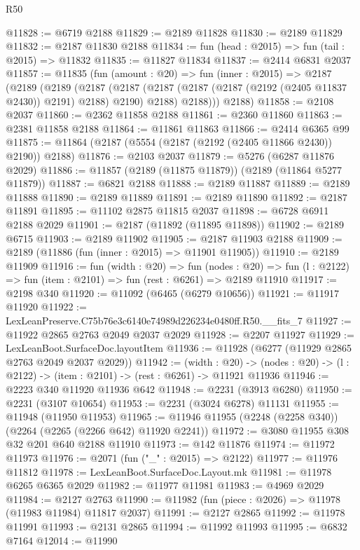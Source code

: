 \begin{lexlean}{R50}
\begin{coremodule}
@11828 := @6719 @2188
@11829 := @2189 @11828
@11830 := @2189 @11829
@11832 := @2187 @11830 @2188
@11834 := fun (head : @2015) => fun (tail : @2015) => @11832
@11835 := @11827 @11834
@11837 := @2414 @6831 @2037
@11857 := @11835
    (fun (amount : @20) =>
    fun (inner : @2015) =>
    @2187
      (@2189
        (@2189
          (@2187
            (@2187 (@2187 (@2187 (@2187 (@2192 (@2405 @11837 @2430)) @2191) @2188) @2190) @2188)
            @2188)))
      @2188)
@11858 := @2108 @2037
@11860 := @2362 @11858 @2188
@11861 := @2360 @11860
@11863 := @2381 @11858 @2188
@11864 := @11861 @11863
@11866 := @2414 @6365 @99
@11875 := @11864 (@2187 (@5554 (@2187 (@2192 (@2405 @11866 @2430)) @2190)) @2188)
@11876 := @2103 @2037
@11879 := @5276 (@6287 @11876 @2029)
@11886 := @11857 (@2189 (@11875 @11879)) (@2189 (@11864 @5277 @11879))
@11887 := @6821 @2188
@11888 := @2189 @11887
@11889 := @2189 @11888
@11890 := @2189 @11889
@11891 := @2189 @11890
@11892 := @2187 @11891
@11895 := @11102 @2875 @11815 @2037
@11898 := @6728 @6911 @2188 @2029
@11901 := @2187 (@11892 (@11895 @11898))
@11902 := @2189 @6715
@11903 := @2189 @11902
@11905 := @2187 @11903 @2188
@11909 := @2189 (@11886 (fun (inner : @2015) => @11901 @11905))
@11910 := @2189 @11909
@11916 := fun (width : @20) =>
  fun (nodes : @20) => fun (l : @2122) => fun (item : @2101) => fun (rest : @6261) => @2189 @11910
@11917 := @2198 @340
@11920 := @11092 (@6465 (@6279 @10656))
@11921 := @11917 @11920
@11922 := LexLeanPreserve.C75b76e3c6140e74989d226234e0480ff.R50.__fits_7
@11927 := @11922 @2865 @2763 @2049 @2037 @2029
@11928 := @2207 @11927
@11929 := LexLeanBoot.SurfaceDoc.layoutItem
@11936 := @11928 (@6277 (@11929 @2865 @2763 @2049 @2037 @2029))
@11942 := (width : @20) ->
  (nodes : @20) -> (l : @2122) -> (item : @2101) -> (rest : @6261) -> @11921 @11936
@11946 := @2223 @340 @11920 @11936 @642
@11948 := @2231 (@3913 @6280)
@11950 := @2231 (@3107 @10654)
@11953 := @2231 (@3024 @6278) @11131
@11955 := @11948 (@11950 @11953)
@11965 := @11946 @11955 (@2248 (@2258 @340)) (@2264 (@2265 (@2266 @642) @11920 @2241))
@11972 := @3080 @11955 @308 @32 @201 @640 @2188 @11910
@11973 := @142 @11876
@11974 := @11972 @11973
@11976 := @2071 (fun ("_" : @2015) => @2122)
@11977 := @11976 @11812
@11978 := LexLeanBoot.SurfaceDoc.Layout.mk
@11981 := @11978 @6265 @6365 @2029
@11982 := @11977 @11981
@11983 := @4969 @2029
@11984 := @2127 @2763
@11990 := @11982 (fun (piece : @2026) => @11978 (@11983 @11984) @11817 @2037)
@11991 := @2127 @2865
@11992 := @11978 @11991
@11993 := @2131 @2865
@11994 := @11992 @11993
@11995 := @6832 @7164
@12014 := @11990

\end{coremodule}
\end{lexlean}
